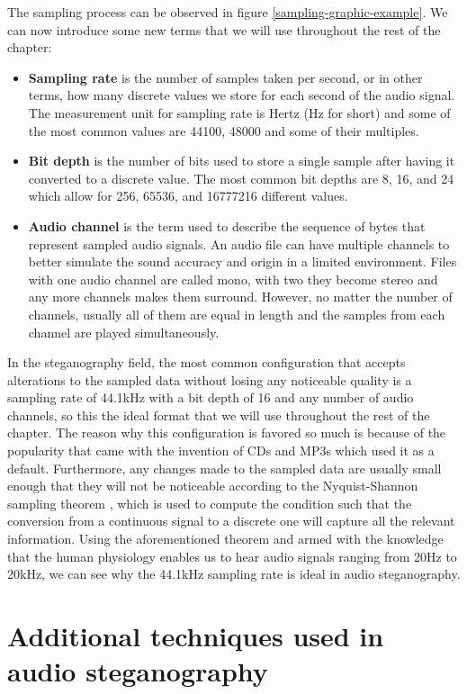 \begin{multicols}{2}
The sampling process can be observed in figure \ref{sampling-graphic-example}. We can now introduce some new terms that we will use throughout the rest of the chapter:
\begin{itemize}
	\item \textbf{Sampling rate} is the number of samples taken per second, or in other terms, how many discrete values we store for each second of the audio signal. The measurement unit for sampling rate is Hertz (Hz for short) and some of the most common values are 44100, 48000 and some of their multiples.
	\item \textbf{Bit depth} is the number of bits used to store a single sample after having it converted to a discrete value. The most common bit depths are 8, 16, and 24 which allow for 256, 65536, and 16777216 different values. 
	\item \textbf{Audio channel} is the term used to describe the sequence of bytes that represent sampled audio signals. An audio file can have multiple channels to better simulate the sound accuracy and origin in a limited environment. Files with one audio channel are called mono, with two they become stereo and any more channels makes them surround. However, no matter the number of channels, usually all of them are equal in length and the samples from each channel are played simultaneously.
\end{itemize}

In the steganography field, the most common configuration that accepts alterations to the sampled data without losing any noticeable quality is a sampling rate of 44.1kHz with a bit depth of 16 and any number of audio channels, so this the ideal format that we will use throughout the rest of the chapter. The reason why this configuration is favored so much is because of the popularity that came with the invention of CDs and MP3s which used it as a default. Furthermore, any changes made to the sampled data are usually small enough that they will not be noticeable according to the Nyquist-Shannon sampling theorem \cite{Shannon1949}, which is used to compute the condition such that the conversion from a continuous signal to a discrete one will capture all the relevant information. Using the aforementioned theorem and armed with the knowledge that the human physiology enables us to hear audio signals ranging from 20Hz to 20kHz, we can see why the 44.1kHz sampling rate is ideal in audio steganography.

\section{Additional techniques used in audio steganography}

\end{multicols}
